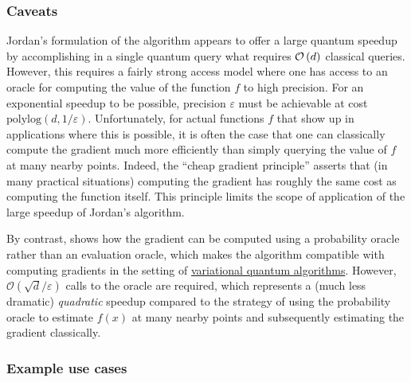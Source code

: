 \begin{refsection}

\subsubsection*{Caveats}

Jordan's formulation of the algorithm \cite{jordan2005QuantGrad} appears to offer a large quantum speedup by accomplishing in a single quantum query what requires $\mathcal{O}\left( d \right)$ classical queries. However, this requires a fairly strong access model where one has access to an oracle for computing the value of the function $f$ to high precision. For an exponential speedup to be possible, precision $\varepsilon$ must be achievable at cost $\mathrm{polylog}(d,1/\varepsilon)$. Unfortunately, for actual functions $f$ that show up in applications where this is possible, it is often the case that one can classically compute the gradient much more efficiently than simply querying the value of $f$ at many nearby points. Indeed, the ``cheap gradient principle'' \cite{griewank2008EvalDerivatives,bolte2022nonsmooth} asserts that (in many practical situations) computing the gradient has roughly the same cost as computing the function itself. This principle limits the scope of application of the large speedup of Jordan's algorithm. 

By contrast, \cite{gilyen2017OptQOptAlgGrad} shows how the gradient can be computed using a probability oracle rather than an evaluation oracle, which makes the algorithm compatible with computing gradients in the setting of \hyperref[prim:VQA]{variational quantum algorithms}. However, $\mathcal{O}(\sqrt{d}/\varepsilon)$ calls to the oracle are required, which represents a (much less dramatic) \emph{quadratic} speedup compared to the strategy of using the probability oracle to estimate $f(x)$ at many nearby points and subsequently estimating the gradient classically. 



\subsubsection*{Example use cases}


\end{refsection}
